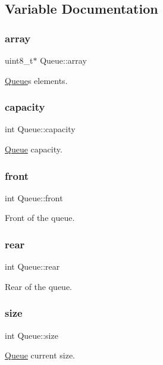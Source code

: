 \subsection{Variable Documentation}
\mbox{\label{group__queue_ga39d406adce9a616cce11f7c124593c94}} 
\subsubsection{\texorpdfstring{array}{array}}
{\footnotesize\ttfamily uint8\+\_\+t$\ast$ Queue\+::array}



\mbox{\hyperlink{struct_queue}{Queue}}\textquotesingle{}s elements. 

\mbox{\label{group__queue_ga003d8f2aacb10aa84f38ff89e93ccf74}} 
\subsubsection{\texorpdfstring{capacity}{capacity}}
{\footnotesize\ttfamily int Queue\+::capacity}



\mbox{\hyperlink{struct_queue}{Queue}} capacity. 

\mbox{\label{group__queue_gaa14801d5c5fea47f3d08483d103e0b57}} 
\subsubsection{\texorpdfstring{front}{front}}
{\footnotesize\ttfamily int Queue\+::front}



Front of the queue. 

\mbox{\label{group__queue_ga8303807ce298d63d958f7e5765034d70}} 
\subsubsection{\texorpdfstring{rear}{rear}}
{\footnotesize\ttfamily int Queue\+::rear}



Rear of the queue. 

\mbox{\label{group__queue_gac7d9701d244e3ba255ef8556e0562dc6}} 
\subsubsection{\texorpdfstring{size}{size}}
{\footnotesize\ttfamily int Queue\+::size}



\mbox{\hyperlink{struct_queue}{Queue}} current size. 

